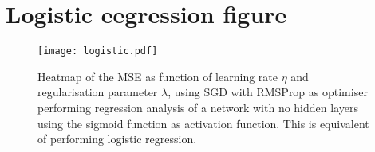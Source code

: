 \clearpage

\section{Logistic eegression figure}

\begin{figure}[h!]
    \texttt{[image: logistic.pdf]}
    \caption{Heatmap of the MSE as function of learning rate $\eta$ and regularisation parameter $\lambda$, using SGD with RMSProp as optimiser performing regression analysis of a network with no hidden layers using the sigmoid function as activation function. This is equivalent of performing logistic regression.}
    \label{fig:logistic_eta_lambda}
\end{figure}